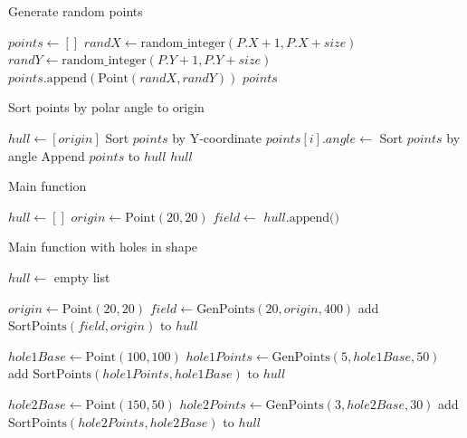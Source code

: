 \documentclass[final]{cmpreport_02}
\begin{document}
\begin{algorithm}[h!]
	\caption{Generate random points}
	\label{mg:genPoints}
	\begin{algorithmic}[1]
		\State $points \gets []$
		\State $randX \gets \text{random\_integer}(P.X + 1, P.X + size)$
		\State $randY \gets \text{random\_integer}(P.Y + 1, P.Y + size)$
		\State $points.\text{append}(\text{Point}(randX, randY))$
		\EndFor
		\State \Return $points$
		\EndFunction
	\end{algorithmic}
\end{algorithm}

\begin{algorithm}[h!]
	\caption{Sort points by polar angle to origin}
	\label{mg:sortPoints}
	\begin{algorithmic}[1]
		\State $hull \gets [origin]$
		\State Sort $points$ by Y-coordinate
		\State $points[i].angle \gets$ 
		\EndFor
		\State Sort $points$ by angle
		\State Append $points$ to $hull$
		\State \Return $hull$
		\EndFunction
	\end{algorithmic}
\end{algorithm}

\begin{algorithm}[h!]
	\caption{Main function}
	\label{mg:main}
	\begin{algorithmic}[1]
		\State $hull \gets []$
		\State $origin \gets \text{Point}(20, 20)$
		\State $field \gets$ 
		\State $hull.\text{append}($$)$
		\EndFunction
	\end{algorithmic}
\end{algorithm}

\begin{algorithm}[h!]
	\caption{Main function with holes in shape}
	\label{mg:mainWithHoles}
	\begin{algorithmic}[1]
		\State $hull \gets$ empty list

		\State $origin \gets \text{Point}(20, 20)$
		\State $field \gets \text{GenPoints}(20, origin, 400)$
		\State add $\text{SortPoints}(field, origin)$ to $hull$

		\State $hole1Base \gets \text{Point}(100, 100)$
		\State $hole1Points \gets \text{GenPoints}(5, hole1Base, 50)$
		\State add $\text{SortPoints}(hole1Points, hole1Base)$ to $hull$

		\State $hole2Base \gets \text{Point}(150, 50)$
		\State $hole2Points \gets \text{GenPoints}(3, hole2Base, 30)$
		\State add $\text{SortPoints}(hole2Points, hole2Base)$ to $hull$
		\EndProcedure
	\end{algorithmic}
\end{algorithm}
\end{document}
